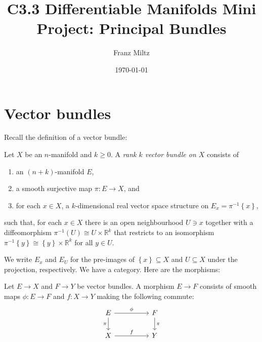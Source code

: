 \documentclass{article}
\begin{document}
\title{C3.3 Differentiable Manifolds Mini Project: Principal Bundles}
\author{Franz Miltz}
\date{\today}
\maketitle


\section{Vector bundles}

Recall the definition of a vector bundle:

\begin{definition}
  Let $X$ be an $n$-manifold and $k\geq 0$.
  A \emph{rank $k$ vector bundle on $X$} consists of
  \begin{enumerate}
    \item an $(n+k)$-manifold $E$,
    \item a smooth surjective map $\pi : E\to X$, and
    \item for each $x\in X$, a $k$-dimensional real vector space structure on $E_x = {\pi}^{-1}\left\lbrace{x}\right\rbrace$,
  \end{enumerate}
  such that, for each $x\in X$ there is an open neighbourhood $U\ni x$
  together with a diffeomorphism ${\pi}^{-1}(U)\cong U\times\mathbb{R}^k$ that restricts to an isomorphism ${\pi}^{-1}\left\lbrace{y}\right\rbrace\cong\left\lbrace{y}\right\rbrace\times\mathbb{R}^k$ for all $y\in U$.
\end{definition}

We write $E_x$ and $E_U$ for the pre-images of
$\left\lbrace{x}\right\rbrace\subseteq X$ and $U\subseteq X$ under the
projection, respectively. We have a category. Here are the morphisms:

\begin{definition}
  Let $E\to X$ and $F\to Y$ be vector bundles.
  A morphism $E\to F$ consists of smooth maps $\phi:E\to F$ and
  $f:X\to Y$ making the following commute:
  \begin{equation*}
    \begin{tikzcd}
      E && F \\
      X && Y
      \arrow["\phi", from=1-1, to=1-3]
      \arrow["f", from=2-1, to=2-3]
      \arrow["\pi"', from=1-1, to=2-1]
      \arrow["\pi", from=1-3, to=2-3]
    \end{tikzcd}
  \end{equation*}
\end{definition}
\end{document}
